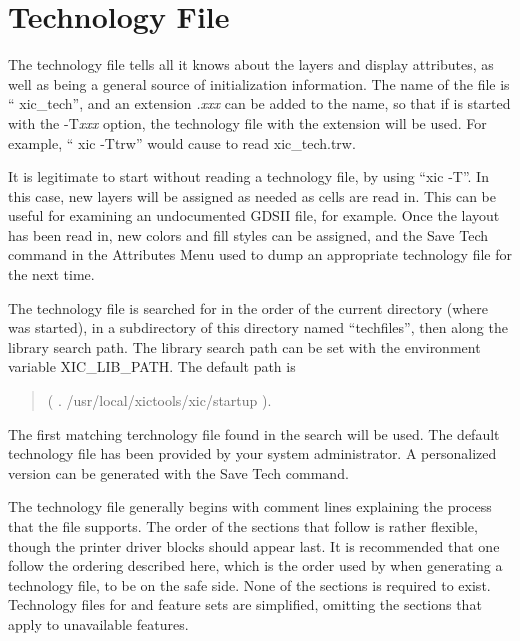 
\appendix
\chapter{Technology File}
\label{techfile}
The technology file tells {\Xic} all it knows about the layers and
display attributes, as well as being a general source of
initialization information.  The name of the file is ``{\vt
xic\_tech}'', and an extension {\it .xxx\/} can be added to the name,
so that if {\Xic} is started with the {\vt -T}{\it xxx\/} option, the
technology file with the extension will be used.  For example, ``{\vt
xic -Ttrw}'' would cause {\Xic} to read {\vt xic\_tech.trw}.

It is legitimate to start {\Xic} without reading a technology file, by
using ``{\vt xic -T}''.  In this case, new layers will be assigned as
needed as cells are read in.  This can be useful for examining an
undocumented GDSII file, for example.  Once the layout has been read
in, new colors and fill styles can be assigned, and the {\cb Save
Tech} command in the {\cb Attributes Menu} used to dump an appropriate
technology file for the next time.

The technology file is searched for in the order of the current
directory (where {\Xic} was started), in a subdirectory of this
directory named ``{\vt techfiles}'', then along the library search path. 
The library search path can be set with the environment variable {\et
XIC\_LIB\_PATH}.  The default path is
\begin{quote}
 {\vt ( . /usr/local/xictools/xic/startup )}.
\end{quote}
The first matching terchnology file found in the search will be used. 
The default technology file has been provided by your system
administrator.  A personalized version can be generated with the {\cb
Save Tech} command.

The technology file generally begins with comment lines explaining the
process that the file supports.  The order of the sections that follow
is rather flexible, though the printer driver blocks should appear
last.  It is recommended that one follow the ordering described here,
which is the order used by {\Xic} when generating a technology file,
to be on the safe side.  None of the sections is required to exist. 
Technology files for {\XicII} and {\Xiv} feature sets are simplified,
omitting the sections that apply to unavailable features.

